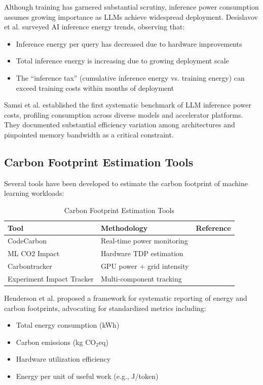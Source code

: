 \documentclass[11pt]{article}
\begin{document}
Although training has garnered substantial scrutiny, inference power consumption assumes growing importance as LLMs achieve widespread deployment. Desislavov et al. \cite{desislavov2023compute} surveyed AI inference energy trends, observing that:
\begin{itemize}
    \item Inference energy per query has decreased due to hardware improvements
    \item Total inference energy is increasing due to growing deployment scale
    \item The ``inference tax'' (cumulative inference energy vs. training energy) can exceed training costs within months of deployment
\end{itemize}

Samsi et al. \cite{samsi2023words} established the first systematic benchmark of LLM inference power costs, profiling consumption across diverse models and accelerator platforms. They documented substantial efficiency variation among architectures and pinpointed memory bandwidth as a critical constraint.

\subsection{Carbon Footprint Estimation Tools}

Several tools have been developed to estimate the carbon footprint of machine learning workloads:

\begin{table}[h]
\centering
\caption{Carbon Footprint Estimation Tools}
\label{tab:carbon_tools}
\begin{tabular}{lll}
\toprule
\textbf{Tool} & \textbf{Methodology} & \textbf{Reference} \\
\midrule
CodeCarbon & Real-time power monitoring & \cite{codecarbon} \\
ML CO2 Impact & Hardware TDP estimation & \cite{mlco2} \\
Carbontracker & GPU power + grid intensity & \cite{anthony2020carbontracker} \\
Experiment Impact Tracker & Multi-component tracking & \cite{henderson2020towards} \\
\bottomrule
\end{tabular}
\end{table}

Henderson et al. \cite{henderson2020towards} proposed a framework for systematic reporting of energy and carbon footprints, advocating for standardized metrics including:
\begin{itemize}
    \item Total energy consumption (kWh)
    \item Carbon emissions (kg CO$_2$eq)
    \item Hardware utilization efficiency
    \item Energy per unit of useful work (e.g., J/token)
\end{itemize}
\end{document}

